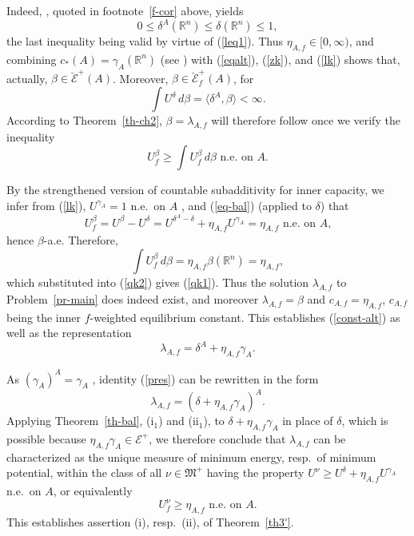 \documentclass[12pt,a4paper,reqno]{amsart} %
\theoremstyle{lause}
\theoremstyle{maaritelma}
\theoremstyle{lause}
\theoremstyle{maaritelma}
\numberwithin{equation}{section}
\begin{document}
Indeed, \cite[Corollary~4.9]{Z-bal}, quoted in footnote~\ref{f-cor} above, yields
\begin{equation}\label{balbound}0\leqslant\delta^A(\mathbb R^n)\leqslant\delta(\mathbb R^n)\leqslant1,\end{equation}
the last inequality being valid by virtue of (\ref{leq1}). Thus $\eta_{A,f}\in[0,\infty)$, and combining $c_*(A)=\gamma_A(\mathbb R^n)$ (see \cite[Theorem~2.6]{L}) with (\ref{eqalt}), (\ref{zk}), and (\ref{lk}) shows that, actually, $\beta\in\breve{\mathcal E}^+(A)$. Moreover, $\beta\in\breve{\mathcal E}^+_f(A)$, for
\begin{equation*}\label{finn}
\int U^\delta\,d\beta=\langle\delta^A,\beta\rangle<\infty.
\end{equation*}
According to Theorem~\ref{th-ch2}, $\beta=\lambda_{A,f}$ will therefore follow once we verify the inequality
\begin{equation}\label{qk1}U_f^\beta\geqslant\int U_f^\beta\,d\beta\text{ \ n.e.\ on $A$}.\end{equation}

By the strengthened version of countable subadditivity for inner capacity, we infer from (\ref{lk}), $U^{\gamma_A}=1$ n.e.\ on $A$ \cite[p.~145]{L}, and (\ref{eq-bal}) (applied to $\delta$) that
\begin{equation}\label{qk2}U_f^\beta=U^\beta-U^\delta=U^{\delta^A-\delta}+\eta_{A,f}U^{\gamma_A}=\eta_{A,f}\text{ \ n.e.\ on $A$,}\end{equation}
hence $\beta$-a.e. Therefore,
\[\int U_f^\beta\,d\beta=\eta_{A,f}\beta(\mathbb R^n)=\eta_{A,f},\] which substituted into (\ref{qk2}) gives (\ref{qk1}). Thus the solution $\lambda_{A,f}$ to Problem~\ref{pr-main} does indeed exist, and moreover $\lambda_{A,f}=\beta$ and $c_{A,f}=\eta_{A,f}$,
$c_{A,f}$ being the inner $f$-weighted equilibrium constant. This establishes (\ref{const-alt}) as well as the representation
\begin{equation}\label{pres}
\lambda_{A,f}=\delta^A+\eta_{A,f}\gamma_A.
\end{equation}

As $(\gamma_A)^A=\gamma_A$ \cite[Lemma~9.1]{Z-arx-22}, identity (\ref{pres}) can be rewritten in the form
\begin{equation*}\label{bal}
\lambda_{A,f}=(\delta+\eta_{A,f}\gamma_A)^A.
\end{equation*}
Applying Theorem~\ref{th-bal}, (i$_1$) and (ii$_1$), to $\delta+\eta_{A,f}\gamma_A$ in place of $\delta$, which is possible because $\eta_{A,f}\gamma_A\in\mathcal E^+$, we therefore conclude that $\lambda_{A,f}$ can be characterized as the unique measure of minimum energy, resp.\ of minimum potential, within the class of all $\nu\in\mathfrak M^+$ having the property $U^\nu\geqslant U^\delta+\eta_{A,f}U^{\gamma_A}$  n.e.\ on $A$,
or equivalently
\[U^\nu_f\geqslant\eta_{A,f}\text{ \ n.e.\ on $A$}.\]
This establishes assertion (i), resp.\ (ii), of Theorem~\ref{th3'}.
\end{document}
